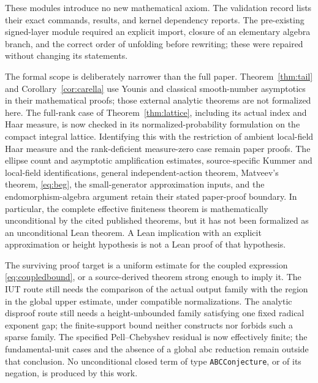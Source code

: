 \documentclass[11pt]{amsart}
\theoremstyle{definition}
\theoremstyle{remark}
\begin{document}
These modules introduce no new mathematical axiom. The validation record
lists their exact commands, results, and kernel dependency reports.
The pre-existing signed-layer module required an explicit import, closure
of an elementary algebra branch, and the correct order of unfolding before
rewriting; these were repaired without changing its statements.

The formal scope is deliberately narrower than the full paper.
Theorem~\ref{thm:tail} and Corollary~\ref{cor:carella} use Younis and classical
smooth-number asymptotics in their mathematical proofs; those external
analytic theorems are not formalized here. The full-rank case of
Theorem~\ref{thm:lattice}, including its actual index and Haar measure,
is now checked in its normalized-probability formulation on the compact
integral lattice. Identifying this with the restriction of ambient
local-field Haar measure and the rank-deficient measure-zero case remain
paper proofs. The ellipse count and asymptotic amplification estimates,
source-specific Kummer and local-field identifications, general
independent-action theorem, Matveev's theorem, \eqref{eq:beg}, the
small-generator approximation inputs, and the endomorphism-algebra
argument retain their stated paper-proof boundary. In particular, the
complete effective finiteness theorem is mathematically unconditional
by the cited published theorems, but it has not been formalized as an
unconditional Lean theorem. A Lean implication with an explicit
approximation or height hypothesis is not a Lean proof of that hypothesis.

The surviving proof target is a uniform estimate for the coupled expression
\eqref{eq:coupledbound}, or a source-derived theorem strong enough to imply
it. The IUT route still needs the comparison of the actual output family
with the region in the global upper estimate, under compatible
normalizations. The analytic disproof route still
needs a height-unbounded family satisfying one fixed radical exponent gap;
the finite-support bound neither constructs nor forbids such a sparse
family. The specified Pell--Chebyshev residual is now effectively finite;
the fundamental-unit cases and the absence of a global abc reduction remain
outside that conclusion. No unconditional closed term
of type \texttt{ABCConjecture}, or of its negation, is produced by this work.
\end{document}
